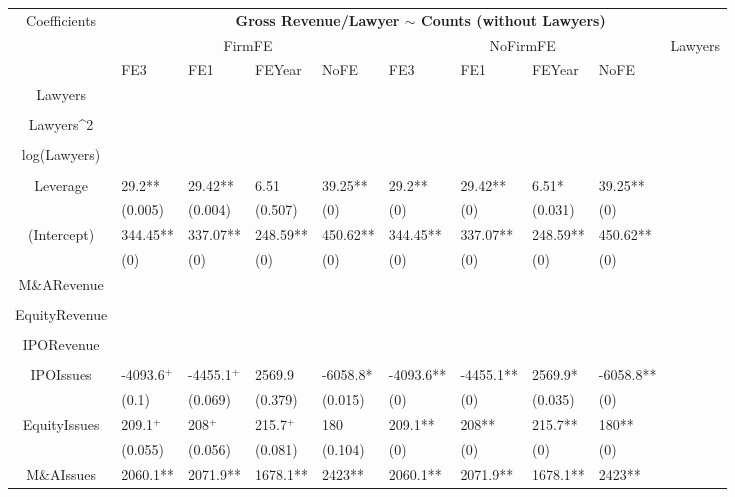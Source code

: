 \documentclass{article}
\begin{document}
\begin{table}[H]
\centering
\begin{tabular}{|clllllllll|}
\hline
\multirow{3}{*}{Coefficients} & \multicolumn{9}{c|}{\textbf{Gross Revenue/Lawyer $\sim$ Counts (without Lawyers)}} \\
\cline{2-10}
& \multicolumn{4}{c}{FirmFE} & \multicolumn{4}{c}{NoFirmFE} & \multirow{2}{*}{Lawyers} \\
\cline{2-9}
& FE3 & FE1 & FEYear & NoFE & FE3 & FE1 & FEYear & NoFE &  \\
\hline
 
Lawyers &  &  &  &  &  &  &  &  & \\ 
   &  &  &  &  &  &  &  &  & \\ 
  Lawyers^2 &  &  &  &  &  &  &  &  & \\ 
   &  &  &  &  &  &  &  &  & \\ 
  log(Lawyers) &  &  &  &  &  &  &  &  & \\ 
   &  &  &  &  &  &  &  &  & \\ 
  Leverage & 29.2** & 29.42** & 6.51 & 39.25** & 29.2** & 29.42** & 6.51* & 39.25** & \\ 
   & (0.005) & (0.004) & (0.507) & (0) & (0) & (0) & (0.031) & (0) & \\ 
  (Intercept) & 344.45** & 337.07** & 248.59** & 450.62** & 344.45** & 337.07** & 248.59** & 450.62** & \\ 
   & (0) & (0) & (0) & (0) & (0) & (0) & (0) & (0) & \\ 
  M\&ARevenue &  &  &  &  &  &  &  &  & \\ 
   &  &  &  &  &  &  &  &  & \\ 
  EquityRevenue &  &  &  &  &  &  &  &  & \\ 
   &  &  &  &  &  &  &  &  & \\ 
  IPORevenue &  &  &  &  &  &  &  &  & \\ 
   &  &  &  &  &  &  &  &  & \\ 
  IPOIssues & -4093.6$^{+}$ & -4455.1$^{+}$ & 2569.9 & -6058.8* & -4093.6** & -4455.1** & 2569.9* & -6058.8** & \\ 
   & (0.1) & (0.069) & (0.379) & (0.015) & (0) & (0) & (0.035) & (0) & \\ 
  EquityIssues & 209.1$^{+}$ & 208$^{+}$ & 215.7$^{+}$ & 180 & 209.1** & 208** & 215.7** & 180** & \\ 
   & (0.055) & (0.056) & (0.081) & (0.104) & (0) & (0) & (0) & (0) & \\ 
  M\&AIssues & 2060.1** & 2071.9** & 1678.1** & 2423** & 2060.1** & 2071.9** & 1678.1** & 2423** & \\ 

\end{tabular}
\end{table}
\end{document}
